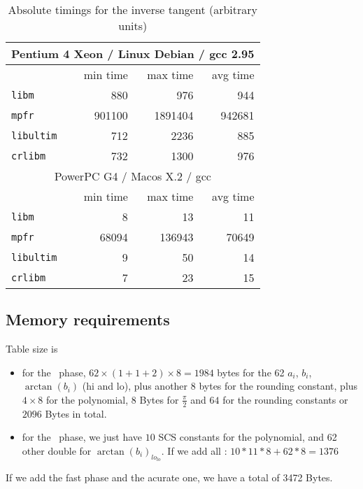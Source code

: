 \begin{table}[!htb]
\begin{center}
\renewcommand{\arraystretch}{1.2}
\begin{tabular}{|l|r|r|r|}
\hline
\hline

 \multicolumn{4}{|c|}{Pentium 4 Xeon / Linux Debian / gcc 2.95}   \\
 \hline
                         & min time      & max time      & avg time \\
 \hline
 \texttt{libm}           & 880          & 976           &        944 \\
 \hline
  \texttt{mpfr}          & 901100       & 1891404       &     942681 \\
 \hline
  \texttt{libultim}      & 712          & 2236          &        885 \\
 \hline
 \texttt{crlibm}         & 732          & 1300          &        976 \\
 \hline

\multicolumn{4}{|c|}{PowerPC G4 / Macos X.2 / gcc }   \\

 \hline
                         & min time      & max time      & avg time \\ 
 \hline
 \texttt{libm}           & 8            & 13            &         11 \\ 
 \hline
  \texttt{mpfr}          & 68094        & 136943        &      70649 \\ 
 \hline
  \texttt{libultim}      & 9            & 50            &         14 \\ 
 \hline
 \texttt{crlibm}         & 7            & 23            &         15 \\ 
 \hline

\end{tabular}
\end{center}
\caption{Absolute timings for the inverse tangent (arbitrary units)
  \label{tbl:arctan_abstime}}
\end{table}

\subsection{Memory requirements}
Table size is
\begin{itemize}
\item for the \quick\ phase,
  $62\times (1+1+2) \times8=1984$ bytes for the 62 $a_i$, $b_i$,
  $\arctan(b_i)$ (hi and lo), plus another $8$ bytes for the rounding
  constant, plus $4\times8$ for the polynomial, $8$ Bytes for
  $\frac{\pi}{2}$ and $64$ for the rounding constants or $2096$ Bytes in
  total.
  
\item for the \accurate\ phase, we just have $10$ SCS constants for the
  polynomial, and 62 other double for $\arctan(b_i)_{lo_{lo}}$.
  If we add all : $10*11*8 + 62*8 = 1376$
\end{itemize}
If we add the fast phase and the acurate one, we have a total of 3472
Bytes.


